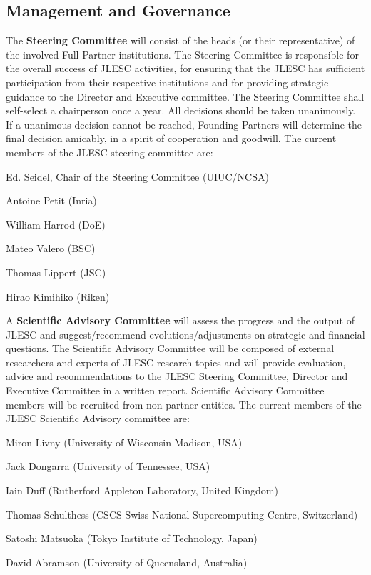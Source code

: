 \documentclass[12pt]{article}
\theoremstyle{definition}
\begin{document}
\subsection{Management and Governance} 
\enlargethispage{\baselineskip}
The \textbf{Steering Committee} will consist of the heads (or their representative) of the involved Full Partner institutions. The Steering Committee is responsible for the overall success of JLESC activities, for ensuring that the JLESC has sufficient participation from their respective institutions and for providing strategic guidance to the Director and Executive committee. 
The Steering Committee shall self-select a chairperson once a year. All decisions should be taken unanimously. If a unanimous decision cannot be reached, Founding Partners will determine the final decision amicably, in a spirit of cooperation and goodwill. The current members of the JLESC steering committee are:
\begin{compactenum}
\item Ed. Seidel, Chair of the Steering Committee (UIUC/NCSA)
\item Antoine Petit (Inria)
\item William Harrod (DoE)
\item Mateo Valero (BSC)
\item Thomas Lippert (JSC)
\item Hirao Kimihiko (Riken)
\end{compactenum}
\bigskip

A \textbf{Scientific Advisory Committee} will assess the progress and the output of JLESC and suggest/recommend evolutions/adjustments on strategic and financial questions. The Scientific Advisory Committee will be composed of external researchers and experts of JLESC research topics and will provide evaluation, advice and recommendations to the JLESC Steering  Committee,  Director and Executive Committee in a written report. Scientific Advisory Committee members will be recruited from non-partner entities. The current members of the JLESC Scientific Advisory committee are:
\begin{compactenum}
\item Miron Livny (University of Wisconsin-Madison, USA)
\item Jack Dongarra (University of Tennessee, USA)
\item Iain Duff (Rutherford Appleton Laboratory, United Kingdom)
\item Thomas Schulthess (CSCS Swiss National Supercomputing Centre, Switzerland)
\item Satoshi Matsuoka (Tokyo Institute of Technology, Japan)
\item David Abramson (University of Queensland, Australia)
\end{compactenum}
\bigskip
\end{document}
